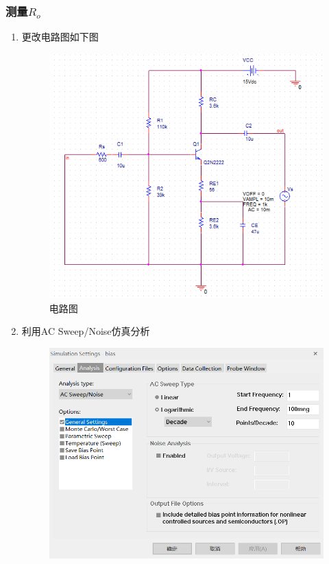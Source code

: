 \documentclass{../source/Experiment}
\begin{document}
            \subsubsection{测量$R_o$}
            \begin{enumerate}
                \item 更改电路图如下图
                    \begin{figure}[h]
                        \centering
                        \includegraphics[scale = 0.8]{pic/仿真4}
                        \caption{电路图}
                    \end{figure}
                \item 利用AC Sweep/Noise仿真分析
                    \newpage
                    \begin{figure}[h]
                        \centering
                        \includegraphics[scale = 0.6]{pic/仿真2}

\end{figure}
\end{enumerate}
\end{document}
